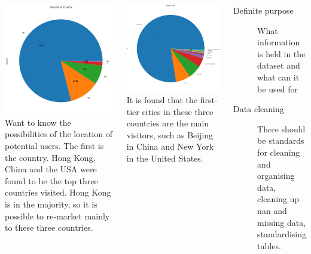\documentclass{tikzposter} %
\begin{document}
\begin{columns}
{			\begin{tikzfigure}%
				\includegraphics[width=0.4\linewidth]{figures//ll3.png}
				Want to know the possibilities of the location of potential users. The first is the country. Hong Kong, China and the USA were found to be the top three countries visited. Hong Kong is in the majority, so it is possible to re-market mainly to these three countries.
			\end{tikzfigure}
			\begin{tikzfigure}%
				\includegraphics[width=0.4\linewidth]{figures//ll4.png}
				It is found that the first-tier cities in these three countries are the main visitors, such as Beijing in China and New York in the United States.
			\end{tikzfigure}
		}
		
		
		
		{
			\begin{description}
				\item[Definite purpose]
				What information is held in the dataset and what can it be used for
				
				\item[Data cleaning]
				There should be standards for cleaning and organising data, cleaning up nan and missing data, standardising tables.
				

\end{description}}
\end{columns}
\end{document}
